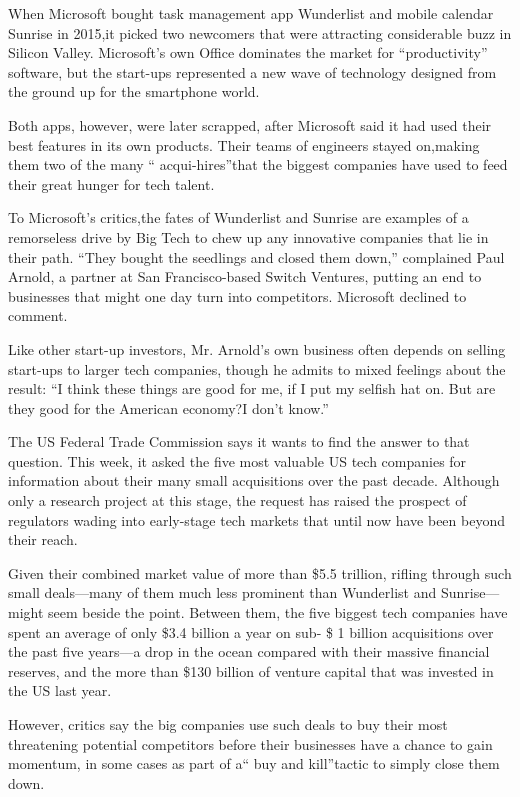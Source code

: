 When Microsoft bought task management app Wunderlist and mobile calendar Sunrise in 2015,it picked two newcomers that were attracting considerable buzz in Silicon Valley. Microsoft's own Office dominates the market for ``productivity'' software, but the start-ups represented a new wave of technology designed from the ground up for the smartphone world.


Both apps, however, were later scrapped, after Microsoft said it had used their best features in its own products. Their teams of engineers stayed on,making them two of the many `` acqui-hires''that the biggest companies have used to feed their great hunger for tech talent.


To Microsoft's critics,the fates of Wunderlist and Sunrise are examples of a remorseless drive by Big Tech to chew up any innovative companies that lie in their path. ``They bought the seedlings and closed them down,'' complained Paul Arnold, a partner at San Francisco-based Switch Ventures, putting an end to businesses that might one day turn into competitors. Microsoft declined to comment.


Like other start-up investors, Mr. Arnold's own business often depends on selling start-ups to larger tech companies, though he admits to mixed feelings about the result: ``I think these things are good for me, if I put my selfish hat on. But are they good for the American economy?I don't know.''


The US Federal Trade Commission says it wants to find the answer to that question. This week, it asked the five most valuable US tech companies for information about their many small acquisitions over the past decade. Although only a research project at this stage, the request has raised the prospect of regulators wading into early-stage tech markets that until now have been beyond their reach.


Given their combined market value of more than \$5.5 trillion, rifling through such small deals—many of them much less prominent than Wunderlist and Sunrise—might seem beside the point. Between them, the five biggest tech companies have spent an average of only \$3.4 billion a year on sub- \$ 1 billion acquisitions over the past five years—a drop in the ocean compared with their massive financial reserves, and the more than \$130 billion of venture capital that was invested in the US last year.


However, critics say the big companies use such deals to buy their most threatening potential competitors before their businesses have a chance to gain momentum, in some cases as part of a`` buy and kill''tactic to simply close them down.



